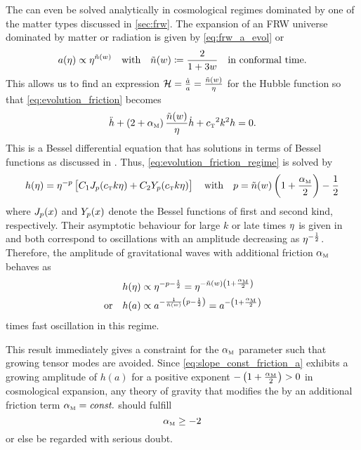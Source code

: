 \documentclass[parskip=half]{scrreprt}
\begin{document}
The  can even be solved analytically in cosmological regimes dominated by one of the matter types discussed in \autoref{sec:frw}. The expansion of an FRW universe dominated by matter or radiation is given by \eqref{eq:frw_a_evol} or
\begin{equation}
	a(\eta) \propto \eta^{\tilde{n}(w)} \quad \text{with} \quad \tilde{n}(w) \coloneqq \frac{2}{1+3w} \quad \text{in conformal time.}
\end{equation}
This allows us to find an expression \(\mathcal{H} = \frac{\dot{a}}{a} = \frac{\tilde{n}(w)}{\eta}\) for the Hubble function so that \eqref{eq:evolution_friction} becomes
\begin{equation}\label{eq:evolution_friction_regime}
	\ddconf{h} + \del{2 + \alphaM} \frac{\nexpconft}{\conft} \dconf{h} + \cT^2 k^2 h = 0
	\eqpunct{.}
\end{equation}
This is a Bessel differential equation that has solutions in terms of Bessel functions as discussed in . Thus, \eqref{eq:evolution_friction_regime} is solved by
\begin{equation}
	h(\conft) = \conft^{-p} \sbr{C_1 \besselJ_p(\cT k \conft) + C_2 \besselY_p(\cT k \conft)} \quad \text{with} \quad p = \nexpconft\del{1 + \frac{\alphaM}{2}}-\frac{1}{2}
\end{equation}
where \(J_p(x)\) and \(Y_p(x)\) denote the Bessel functions of first and second kind, respectively. Their asymptotic behaviour for large \(k\) or late times \(\eta\) is given in  and both correspond to oscillations with an amplitude decreasing as \(\eta^{-\frac{1}{2}}\). Therefore, the amplitude of gravitational waves with additional friction \({\alpha_{\textnormal{\tiny{M}}}}\) behaves as
\begin{subequations}\label{eq:slope_const_friction}
\begin{align}
	h(\conft) &\propto \conft^{-p-\frac{1}{2}} = \conft^{-\nexpconft\del{1+\frac{\alphaM}{2}}} \\
	\text{or} \quad h(a) &\propto a^{-\frac{1}{\nexpconft}\del{p-\frac{1}{2}}} = a^{-\del{1+\frac{\alphaM}{2}}} \label{eq:slope_const_friction_a}
\end{align}
\end{subequations}
times fast oscillation in this regime.

This result immediately gives a constraint for the \({\alpha_{\textnormal{\tiny{M}}}}\) parameter such that growing tensor modes are avoided. Since \eqref{eq:slope_const_friction_a} exhibits a growing amplitude of \(h(a)\) for a positive exponent \(-\del{1+\frac{\alphaM}{2}} > 0\) in cosmological expansion, any theory of gravity that modifies the  by an additional friction term \({\alpha_{\textnormal{\tiny{M}}}}=\textnormal{\textit{const.}}\) should fulfill
\begin{equation}\label{eq:grow_cond_const_fric}
	{\alpha_{\textnormal{\tiny{M}}}} \geq -2
\end{equation}
or else be regarded with serious doubt. 
\end{document}
